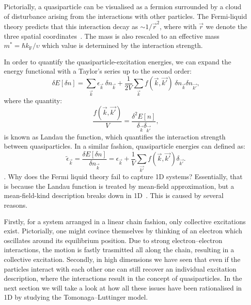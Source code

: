Pictorially, a quasiparticle can be visualised as a fermion surrounded by a cloud of disturbance arising from the interactions with other particles. The Fermi-liquid theory predicts that this interaction decay as $\sim1/\vec{r}^2$, where with $\vec{r}$ we denote the three spatial coordinates~\cite{giamarchi2003quantum}. The mass is also rescaled to an effective mass $m^*=\hbar k_\textrm{F}/\upsilon$ which value is determined by the interaction strength.

In order to quantify the quasiparticle-excitation energies, we can expand the energy functional with a Taylor's series up to the second order:
%
\begin{equation}
    \delta E[\delta n] = \sum_{\vec{k}} \epsilon_{\vec{k}}~\delta n_{\vec{k}} + \frac{1}{2V} \sum_{\vec{k}} f({\vec{k}}, {\vec{k'}})~\delta n_{\vec{k}} \delta n_{\vec{k'}},
\end{equation}
%
where the quantity:
%
\begin{equation}
    \frac{f ({\vec{k}}, {\vec{k'}})}{V} = \frac{\delta^2 E[n]}{\delta_{\vec{k}} \delta_{\vec{k'}}},
\end{equation}
%
is known as Landau the function, which quantifies the interaction strength between quasiparticles. In a similar fashion, quasiparticle energies can defined as:
%
\begin{equation}
    \tilde{\epsilon}_{\vec{k}} = \frac{\delta E[\delta n ]}{\delta n_{\vec{k}}} = \epsilon_{\vec{k}} + \frac{1}{V}\sum_{\vec{k'}} f({\vec{k}},{\vec{k'}})\delta_{\vec{k'}}.
\end{equation}.
%
Why does the Fermi liquid theory fail to capture 1D systems? Essentially, that is because the Landau function is treated by mean-field approximation, but a mean-field-kind description breaks down in 1D~\cite{giamarchi2003quantum}. This is caused by several reasons.

Firstly, for a system arranged in a linear chain fashion, only collective excitations exist. Pictorially, one might covince themselves by thinking of an electron which oscillates around its equilibrium position. Due to strong electron--electron interactions, the motion is fastly trasmitted all along the chain, resulting in a collective excitation. Secondly, in high dimensions we have seen that even if the particles interact with each other one can still recover an individual excitation description, where the interactions result in the concept of quasiparticles. In the next section we will take a look at how all these issues have been rationalised in 1D by studying the Tomonaga--Luttinger model.

